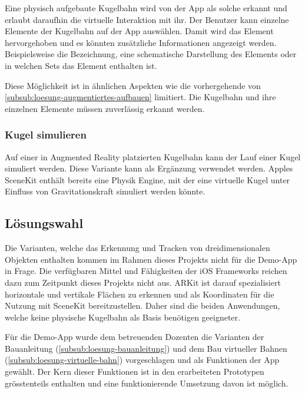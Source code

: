 Eine physisch aufgebaute Kugelbahn wird von der App als solche erkannt und erlaubt daraufhin die virtuelle Interaktion mit ihr.
Der Benutzer kann einzelne Elemente der Kugelbahn auf der App auswählen.
Damit wird das Element hervorgehoben und es könnten zusätzliche Informationen angezeigt werden.
Beispielsweise die Bezeichnung, eine schematische Darstellung des Elements oder in welchen Sets das Element enthalten ist.

Diese Möglichkeit ist in ähnlichen Aspekten wie die vorhergehende von \ref{subsub:loesung-augmentiertes-aufbauen} limitiert.
Die Kugelbahn und ihre einzelnen Elemente müssen zuverlässig erkannt werden.

\subsubsection{Kugel simulieren}

Auf einer in Augmented Reality platzierten Kugelbahn kann der Lauf einer Kugel simuliert werden.
Diese Variante kann als Ergänzung verwendet werden.
Apples SceneKit enthält bereits eine Physik Engine, mit der eine virtuelle Kugel unter Einfluss von Gravitationskraft simuliert werden könnte. 

\subsection{Lösungswahl}\label{sub:loesungswahl}

Die Varianten, welche das Erkennung und Tracken von dreidimensionalen Objekten enthalten kommen im Rahmen dieses Projekts nicht für die Demo-App in Frage.
Die verfügbaren Mittel und Fähigkeiten der iOS Frameworks reichen dazu zum Zeitpunkt dieses Projekts nicht aus.
ARKit ist darauf spezialisiert horizontale und vertikale Flächen zu erkennen und als Koordinaten für die Nutzung mit SceneKit bereitzustellen.
Daher sind die beiden Anwendungen, welche keine physische Kugelbahn als Basis benötigen geeigneter.

Für die Demo-App wurde dem betreuenden Dozenten die Varianten der Bauanleitung (\ref{subsub:loesung-bauanleitung}) und dem Bau virtueller Bahnen (\ref{subsub:loesung-virtuelle-bahn}) vorgeschlagen und als Funktionen der App gewählt.
Der Kern dieser Funktionen ist in den erarbeiteten Prototypen grösstenteils enthalten und eine funktionierende Umsetzung davon ist möglich.
